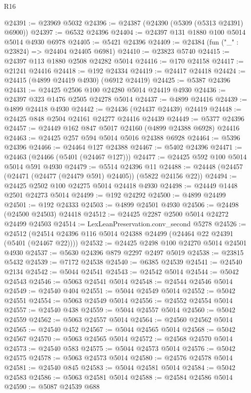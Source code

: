 \begin{lexlean}{R16}
\begin{coremodule}
@24391 := @23969 @5032
@24396 := @24387 (@24390 (@5309 (@5313 @24391) @6900))
@24397 := @6532 @24396
@24404 := @24397 @131 @1880 @100 @5014 @5014 @4930 @6978
@24405 := @5421 @24396
@24409 := @24384 (fun ("_" : @23824) => @24404 @24405 @6981)
@24410 := @23823 @5740
@24415 := @24397 @113 @1880 @2508 @24282 @5014
@24416 := @170 @24158
@24417 := @21241 @24416
@24418 := @192 @24334
@24419 := @24417 @24418
@24424 := @24415 (@4899 @24419 @4930) (@6912 @24419)
@24425 := @5387 @24396
@24431 := @24425 @2506 @100 @24280 @5014 @24419 @4930
@24436 := @24397 @323 @1476 @2505 @24278 @5014
@24437 := @4899 @24416
@24439 := @4899 @24418 @4930
@24442 := @24436 (@24437 @24439) @24419
@24448 := @24425 @848 @2504 @24161 @24277 @24416 @24439
@24449 := @5377 @24396
@24457 := @24449 @162 @847 @5017 @24160 (@4899 @24388 @6928) @24416
@24463 := @24425 @257 @594 @5014 @5016 @24388 @6928
@24464 := @5396 @24396
@24466 := @24464 @127 @24388
@24467 := @5402 @24396
@24471 := @24463 (@24466 (@5401 (@24467 @127)))
@24477 := @24425 @592 @100 @5014 @5014 @591 @4930
@24479 := @5514 @24396 @11
@24488 := @24448 (@24457 (@24471 (@24477 (@24479 @591) @24405)) (@5822 @24156 @22))
@24494 := @24425 @2502 @100 @24275 @5014 @24418 @4930
@24498 := @24449 @1448 @2501 @24273 @5014
@24499 := @192 @24292
@24500 := @4899 @24499
@24501 := @192 @24333
@24503 := @4899 @24501 @4930
@24506 := @24498 (@24500 @24503) @24418
@24512 := @24425 @2287 @2500 @5014 @24272 @24499 @24503
@24514 := LexLeanPreservation.conv_second @5278
@24526 := @24512 (@24514 @24396 @116 @5014 @24388 @24499 (@24464 @22 @24391 (@5401 (@24467 @22))))
@24532 := @24425 @2498 @100 @24270 @5014 @24501 @4930
@24537 := @5630 @24396 @879 @2297 @2497 @5019
@24538 := @23815 @5432
@24539 := @7172 @24538
@24540 := @6385 @24539
@24541 := @24540 @2134
@24542 := @5044 @24541
@24543 := @24542 @5014
@24544 := @5042 @24543
@24546 := @5063 @24541 @5014
@24548 := @24544 @24546 @5014
@24549 := @24540 @404
@24551 := @5044 @24549 @5014
@24552 := @5042 @24551
@24554 := @5063 @24549 @5014
@24556 := @24552 @24554 @5014
@24557 := @24540 @438
@24559 := @5044 @24557 @5014
@24560 := @5042 @24559
@24562 := @5063 @24557 @5014
@24564 := @24560 @24562 @5014
@24565 := @24540 @452
@24567 := @5044 @24565 @5014
@24568 := @5042 @24567
@24570 := @5063 @24565 @5014
@24572 := @24568 @24570 @5014
@24573 := @24540 @583
@24575 := @5044 @24573 @5014
@24576 := @5042 @24575
@24578 := @5063 @24573 @5014
@24580 := @24576 @24578 @5014
@24581 := @24540 @845
@24583 := @5044 @24581 @5014
@24584 := @5042 @24583
@24586 := @5063 @24581 @5014
@24588 := @24584 @24586 @5014
@24590 := @5087 @24539 @688

\end{coremodule}
\end{lexlean}
